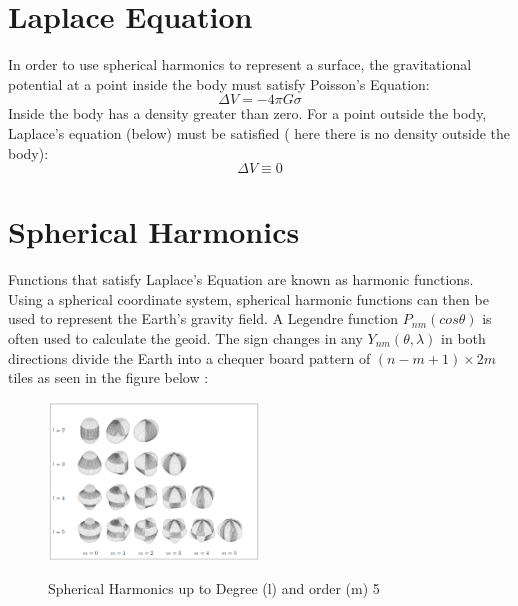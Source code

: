 \section{Laplace Equation}
In order to use spherical harmonics to represent a surface, the gravitational potential at a point inside the body  must satisfy Poisson's Equation:
\begin{equation}
 \Delta V = -4\pi G \sigma
\end{equation}
  Inside the body has a density greater than zero. For a point outside the body, Laplace's equation (below) must be satisfied ( here there is no density outside the body):
\begin{equation} 
    \Delta V \equiv 0 
\end{equation}
 

\section{Spherical Harmonics}
Functions that satisfy Laplace's Equation are known as harmonic functions. Using a spherical coordinate system, spherical harmonic functions can then be used to represent the Earth's gravity field.
A Legendre function $ P_{nm}(cos\theta) $ is often used to calculate the geoid. The sign changes in any $ Y_{nm}(\theta,\lambda) $ in both directions divide the Earth into a chequer board pattern of  $(n-m+1) \times 2m  $ tiles as seen in the figure below \citep{nicoPhysicalgeodesy}:
\begin{figure}[h]
	\centering
	\includegraphics[width=0.5\textwidth]{earth.png}
	\caption{Spherical Harmonics up to Degree (l) and order (m) 5}
	\protect\citet{nicoPhysicalgeodesy}
	\label{fig:nicoearth}
\end{figure} 